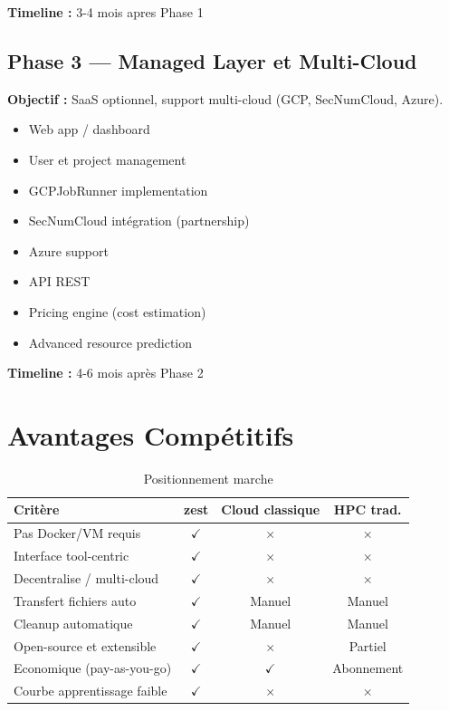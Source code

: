 \documentclass[11pt,a4paper]{article}
\begin{document}
	\textbf{Timeline :} 3-4 mois apres Phase 1
	
	\subsection{Phase 3 --- Managed Layer et Multi-Cloud}
	
	\textbf{Objectif :} SaaS optionnel, support multi-cloud (GCP, SecNumCloud, Azure).
	
	\begin{itemize}
		\item[\,-] Web app / dashboard
		\item[\,-] User et project management
		\item[\,-] GCPJobRunner implementation
		\item[\,-] SecNumCloud intégration (partnership)
		\item[\,-] Azure support
		\item[\,-] API REST
		\item[\,-] Pricing engine (cost estimation)
		\item[\,-] Advanced resource prediction
	\end{itemize}
	
	\textbf{Timeline :} 4-6 mois après Phase 2
	
	\newpage
	
	\section{Avantages Compétitifs}
	
	\begin{table}[H]
		\centering
		\small
		\begin{tabularx}{\linewidth}{l | c | c | c}
			\toprule
			\textbf{Critère} & \textbf{zest} & \textbf{Cloud classique} & \textbf{HPC trad.} \\
			\midrule
			Pas Docker/VM requis & $\checkmark$ & $\times$ & $\times$ \\
			Interface tool-centric & $\checkmark$ & $\times$ & $\times$ \\
			Decentralise / multi-cloud & $\checkmark$ & $\times$ & $\times$ \\
			Transfert fichiers auto & $\checkmark$ & Manuel & Manuel \\
			Cleanup automatique & $\checkmark$ & Manuel & Manuel \\
			Open-source et extensible & $\checkmark$ & $\times$ & Partiel \\
			Economique (pay-as-you-go) & $\checkmark$ & $\checkmark$ & Abonnement \\
			Courbe apprentissage faible & $\checkmark$ & $\times$ & $\times$ \\
			\bottomrule
		\end{tabularx}
		\caption{Positionnement marche}
	\end{table}
	
\end{document}
